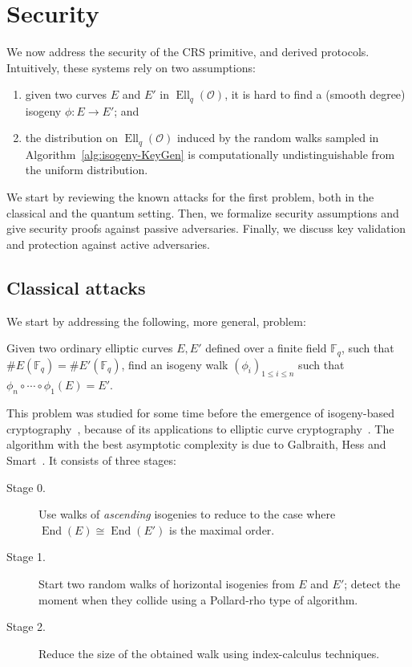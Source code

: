 \documentclass{llncs}
\newcommand{\F}{\mathbb{F}}
\renewcommand{\O}{\mathcal{O}}
\DeclareMathOperator{\End}{End}
\DeclareMathOperator{\Ell}{Ell}
\begin{document}
\section{Security}
\label{sec:sec}

We now address the security of the CRS primitive, and derived
protocols. Intuitively, these systems rely on two assumptions:
\begin{enumerate}
    \item given two curves $E$ and $E'$ in $\Ell_q(\O)$, it is hard to
        find a (smooth degree) isogeny $ϕ:E→E'$; and
    \item the distribution on $\Ell_q(\O)$ induced by the random walks
        sampled in Algorithm~\ref{alg:isogeny-KeyGen} is computationally
        undistinguishable from the uniform distribution.
\end{enumerate}

We start by reviewing the known attacks for the first problem, both in
the classical and the quantum setting. Then, we formalize security
assumptions and give security proofs against passive adversaries.
Finally, we discuss key validation and protection against active
adversaries.

\subsection{Classical attacks}
\label{sec:classical-attacks}

We start by addressing the following, more general, problem:

\begin{problem}
\label{prob:isog}
  Given two ordinary elliptic curves $E,E'$ defined over a finite
  field $\F_q$, such that $\#E(\F_q)=\#E'(\F_q)$, find an isogeny walk
  $(ϕ_i)_{1≤i≤n}$ such that $ϕ_n∘\cdots∘ϕ_1(E)=E'$.
\end{problem}

This problem was studied for some time before the emergence of
isogeny-based cryptography~\cite{Gal,GHS,galbraith+stolbunov11},
because of its applications to elliptic curve
cryptography~\cite{GHS,teske06,jao+miller+venkatesan09}.  The
algorithm with the best asymptotic complexity is due to Galbraith,
Hess and Smart~\cite{GHS}. It consists of three stages:
\begin{description}
\item[Stage 0.] Use walks of \emph{ascending} isogenies to reduce to the case where
  $\End(E)\cong\End(E')$ is the maximal order.
\item[Stage 1.] Start two random walks of horizontal isogenies 
  from $E$ and $E'$; detect the
  moment when they collide using a Pollard-rho type of algorithm.
\item[Stage 2.] Reduce the size of the obtained walk using
  index-calculus techniques.
\end{description}
\end{document}
